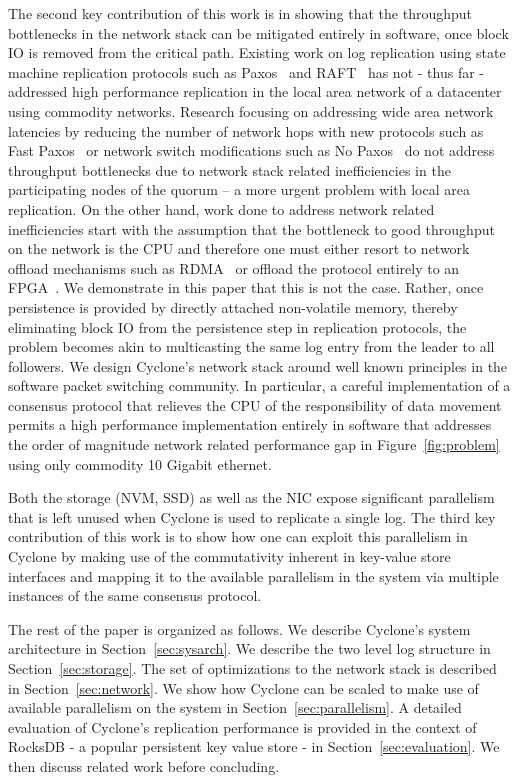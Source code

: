 \documentclass[twocolumn]{article}
\begin{document}
The second key contribution of this work is in showing that the throughput
bottlenecks in the network stack can be mitigated entirely in software, once
block IO is removed from the critical path. Existing work on log replication
using state machine replication protocols such as Paxos~\cite{paxos} and
RAFT~\cite{raft} has not - thus far - addressed high performance replication in
the local area network of a datacenter using commodity networks.  Research
focusing on addressing wide area network latencies by reducing the number of
network hops with new protocols such as Fast Paxos~\cite{fast-paxos} or network
switch modifications such as No Paxos~\cite{nopaxos} do not address throughput
bottlenecks due to network stack related inefficiencies in the participating
nodes of the quorum -- a more urgent problem with local area replication. On the
other hand, work done to address network related inefficiencies start with the
assumption that the bottleneck to good throughput on the network is the CPU and
therefore one must either resort to network offload mechanisms such as RDMA~\cite{dare,
  farm, faast} or offload the protocol entirely to an
FPGA~\cite{consensus_box}. We demonstrate in this paper that this is not the
case. Rather, once persistence is provided by directly attached non-volatile
memory, thereby eliminating block IO from the persistence step in replication
protocols, the problem becomes akin to multicasting the same log entry
from the leader to all followers. We design Cyclone's network stack around well
known principles in the software packet switching community. In particular, a
careful implementation of a consensus protocol that relieves the CPU of the
responsibility of data movement permits a high performance implementation
entirely in software that addresses the order of magnitude network related
performance gap in Figure~\ref{fig:problem} using only commodity 10 Gigabit
ethernet.

Both the storage (NVM, SSD) as well as the NIC expose significant parallelism
that is left unused when Cyclone is used to replicate a single log. The third
key contribution of this work is to show how one can exploit this parallelism in
Cyclone by making use of the commutativity inherent in key-value store
interfaces and mapping it to the available parallelism in the system via
multiple instances of the same consensus protocol.

The rest of the paper is organized as follows. We describe Cyclone's system
architecture in Section~\ref{sec:sysarch}. We describe the two level log
structure in Section~\ref{sec:storage}. The set of optimizations to the network
stack is described in Section~\ref{sec:network}. We show how Cyclone can be
scaled to make use of available parallelism on the system in
Section~\ref{sec:parallelism}. A detailed evaluation of Cyclone's replication
performance is provided in the context of RocksDB - a popular persistent key
value store - in Section~\ref{sec:evaluation}. We then discuss related work
before concluding.
\end{document}
